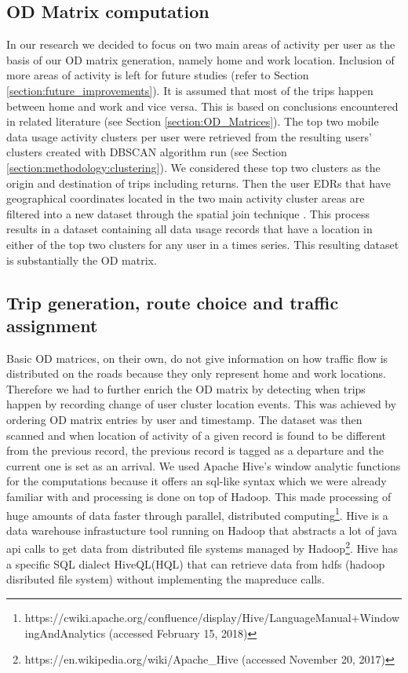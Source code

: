 \documentclass[12pt, a4paper]{report}
\theoremstyle{definition}
\theoremstyle{definition}%
\theoremstyle{definition}%
\theoremstyle{definition}%
\theoremstyle{definition}%
\theoremstyle{definition}%
\begin{document}
\subsection{OD Matrix computation}   \label{subsection:odmatrix_computation}
In our research we decided to focus on two main areas of activity per user as the basis of our OD matrix generation, namely home and work location. Inclusion of more areas of activity is left for future studies (refer to Section \ref{section:future_improvements}). It is assumed that most of the trips happen between home and work and vice versa. This is based on conclusions encountered in related literature (see Section \ref{section:OD_Matrices}). 
The top two mobile data usage activity clusters per user were retrieved from the resulting users' clusters created with DBSCAN algorithm run (see Section \ref{section:methodology:clustering}). We considered these top two clusters as the origin and destination of trips including returns. Then the user EDRs that have geographical coordinates located in the two main activity cluster areas are filtered into a new dataset through the spatial join technique \cite{eldawy2015spatialhadoop}. This process results in a dataset containing all data usage records that have a location in either of the top two clusters for any user in a times series. This resulting dataset is substantially the OD matrix.


\subsection{Trip generation, route choice and traffic assignment} \label{subsection:trip_generation}

Basic OD matrices, on their own, do not give information on how traffic flow is distributed on the roads because they only represent home and work locations. Therefore we had to further enrich the OD matrix by detecting when trips happen by recording change of user cluster location events. This was achieved by ordering OD matrix entries by user and timestamp. The dataset was then scanned and when location of activity of a given record is found to be different from the previous record, the previous record is tagged as a departure and the current one is set as an arrival. We used Apache Hive's window analytic functions for the computations because it offers an sql-like syntax which we were already familiar with and processing is done on top of Hadoop. This made processing of huge amounts of data faster through parallel, distributed computing\footnote{https://cwiki.apache.org/confluence/display/Hive/LanguageManual+WindowingAndAnalytics (accessed February 15, 2018)}. Hive is a data warehouse infrastucture tool running on Hadoop that abstracts a lot of java api calls to get data from distributed file systems managed by Hadoop\footnote{https://en.wikipedia.org/wiki/Apache\_Hive (accessed November 20, 2017)}. Hive has a specific SQL dialect HiveQL(HQL) that can retrieve data from hdfs (hadoop disributed file system) without implementing the mapreduce calls.
\end{document}
